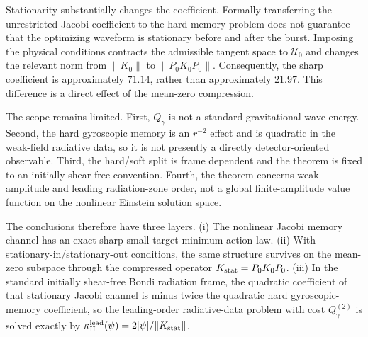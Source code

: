 Stationarity substantially changes the coefficient. Formally transferring the unrestricted Jacobi coefficient to the hard-memory problem does not guarantee that the optimizing waveform is stationary before and after the burst. Imposing the physical conditions contracts the admissible tangent space to $\mathcal U_0$ and changes the relevant norm from $\|K_0\|$ to $\|P_0K_0P_0\|$. Consequently, the sharp coefficient is approximately $71.14$, rather than approximately $21.97$. This difference is a direct effect of the mean-zero compression.

The scope remains limited. First, $Q_\gamma$ is not a standard gravitational-wave energy. Second, the hard gyroscopic memory is an $r^{-2}$ effect and is quadratic in the weak-field radiative data, so it is not presently a directly detector-oriented observable. Third, the hard/soft split is frame dependent and the theorem is fixed to an initially shear-free convention. Fourth, the theorem concerns weak amplitude and leading radiation-zone order, not a global finite-amplitude value function on the nonlinear Einstein solution space.

The conclusions therefore have three layers. (i) The nonlinear Jacobi memory channel has an exact sharp small-target minimum-action law. (ii) With stationary-in/stationary-out conditions, the same structure survives on the mean-zero subspace through the compressed operator $K_{\rm stat}=P_0K_0P_0$. (iii) In the standard initially shear-free Bondi radiation frame, the quadratic coefficient of that stationary Jacobi channel is minus twice the quadratic hard gyroscopic-memory coefficient, so the leading-order radiative-data problem with cost $Q_\gamma^{(2)}$ is solved exactly by $\kappa_{\rm H}^{\rm lead}(\psi)=2|\psi|/\|K_{\rm stat}\|$.


